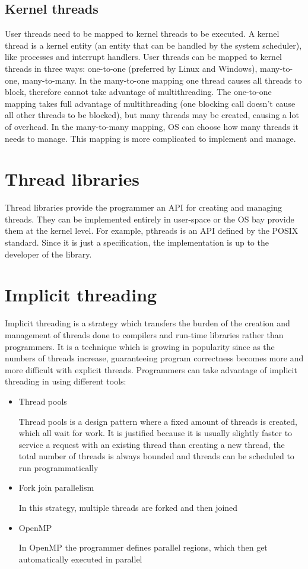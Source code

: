 \subsection{Kernel threads}
User threads need to be mapped to kernel threads to be executed. A kernel thread is a kernel entity (an entity that can be handled by the system scheduler), like processes and interrupt handlers. User threads can be mapped to kernel threads in three ways: one-to-one (preferred by Linux and Windows), many-to-one, many-to-many. In the many-to-one mapping one thread causes all threads to block, therefore cannot take advantage of multithreading. The one-to-one mapping takes full advantage of multithreading (one blocking call doesn't cause all other threads to be blocked), but many threads may be created, causing a lot of overhead. In the many-to-many mapping, OS can choose how many threads it needs to manage. This mapping is more complicated to implement and manage.

\section{Thread libraries}
Thread libraries provide the programmer an API for creating and managing threads. They can be implemented entirely in user-space or the OS bay provide them at the kernel level. For example, pthreads is an API defined by the POSIX standard. Since it is just a specification, the implementation is up to the developer of the library.

\section{Implicit threading}
Implicit threading is a strategy which transfers the burden of the creation and management of threads done to compilers and run-time libraries rather than programmers. It is a technique which is growing in popularity since as the numbers of threads increase, guaranteeing program correctness becomes more and more difficult with explicit threads. Programmers can take advantage of implicit threading in using different tools:
\begin{itemize}
  \item Thread pools
  
  Thread pools is a design pattern where a fixed amount of threads is created, which all wait for work. It is justified because it is usually slightly faster to service a request with an existing thread than creating a new thread, the total number of threads is always bounded and threads can be scheduled to run programmatically
  \item Fork join parallelism
  
  In this strategy, multiple threads are forked and then joined

  \item OpenMP
  
  In OpenMP the programmer defines parallel regions, which then get automatically executed in parallel
\end{itemize}